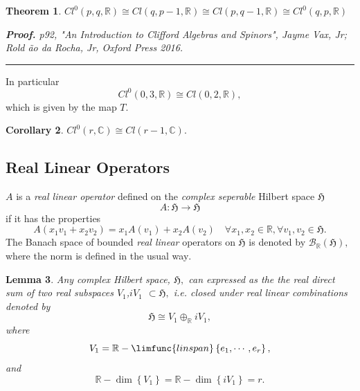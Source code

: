 \documentclass[aps,preprint]{revtex4}
\newtheorem{theorem}{Theorem}
\newtheorem{corollary}[theorem]{Corollary}
\newtheorem{lemma}[theorem]{Lemma}
\newenvironment{proof}[1][Proof]{\noindent\textbf{#1.} }{\ \rule{0.5em}{0.5em}}
\begin{document}
\begin{theorem}
$Cl^{0}\left( p,q,\mathbb{R}\right) \cong Cl\left( q,p-1,\mathbb{R}\right)
\cong Cl\left( p,q-1,\mathbb{R}\right) \cong Cl^{0}\left( q,p,\mathbb{R}%
\right) $

\begin{proof}
p92, "An Introduction to Clifford Algebras and Spinors", Jayme Vax, Jr; Rold%
\~{a}o da Rocha, Jr, Oxford Press 2016.
\end{proof}
\end{theorem}

In particular 
\begin{equation}
Cl^{0}\left( 0,3,\mathbb{R}\right) \cong Cl\left( 0,2,\mathbb{R}\right) ,
\end{equation}%
which is given by the map $T.$

\begin{corollary}
$Cl^{0}\left( r,\mathbb{C}\right) \cong Cl\left( r-1,\mathbb{C}\right) .$
\end{corollary}

\subsection{Real Linear Operators}

$A$ is a \emph{real linear operator} defined on the \emph{complex seperable}
Hilbert space $\mathfrak{H}$ 
\begin{equation}
A:\mathfrak{H\rightarrow H}
\end{equation}%
if it has the properties%
\begin{equation}
A\left( x_{1}v_{1}+x_{2}v_{2}\right) =x_{1}A\left( v_{1}\right)
+x_{2}A\left( v_{2}\right) \quad \forall x_{1},x_{2}\in \mathbb{R},\forall
v_{1},v_{2}\in \mathfrak{H.}
\end{equation}%
The Banach space of bounded \emph{real linear} operators on $\mathfrak{H}$
is denoted by $\mathcal{B}_{\mathbb{R}}\left( \mathfrak{H}\right) ,$ where
the norm is defined in the usual way$.$

\begin{lemma}
Any complex Hilbert space, $\mathfrak{H,}$ can expressed as the the \emph{%
real direct sum} of two \emph{real} subspaces $V_{1}$,$iV_{1}$ $\subset 
\mathfrak{H,}$ i.e. closed under \emph{real linear} combinations denoted by%
\begin{equation}
\mathfrak{H}\cong V_{1}\oplus _{\mathbb{R}}iV_{1},
\end{equation}%
where%
\begin{equation}
V_{1}=\mathbb{R}-\limfunc{linspan}\left\{ e_{1},\cdots ,e_{r}\right\} ,
\end{equation}%
and%
\begin{equation}
\mathbb{R}-\dim \left\{ V_{1}\right\} =\mathbb{R}-\dim \left\{
iV_{1}\right\} =r.
\end{equation}
\end{lemma}
\end{document}
